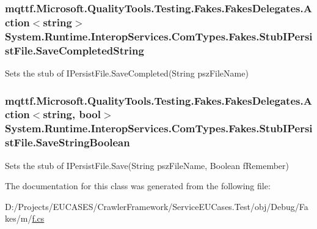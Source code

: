 \hypertarget{class_system_1_1_runtime_1_1_interop_services_1_1_com_types_1_1_fakes_1_1_stub_i_persist_file_a9d11ee894596d550a571c7072408d6ea}{
\subsubsection[{Save\-Completed\-String}]{\setlength{\rightskip}{0pt plus 5cm}mqttf.\-Microsoft.\-Quality\-Tools.\-Testing.\-Fakes.\-Fakes\-Delegates.\-Action$<$string$>$ System.\-Runtime.\-Interop\-Services.\-Com\-Types.\-Fakes.\-Stub\-I\-Persist\-File.\-Save\-Completed\-String}}\label{class_system_1_1_runtime_1_1_interop_services_1_1_com_types_1_1_fakes_1_1_stub_i_persist_file_a9d11ee894596d550a571c7072408d6ea}


Sets the stub of I\-Persist\-File.\-Save\-Completed(\-String psz\-File\-Name)

\hypertarget{class_system_1_1_runtime_1_1_interop_services_1_1_com_types_1_1_fakes_1_1_stub_i_persist_file_adef390bbd75f06dfb1676b0103c910ff}{
\subsubsection[{Save\-String\-Boolean}]{\setlength{\rightskip}{0pt plus 5cm}mqttf.\-Microsoft.\-Quality\-Tools.\-Testing.\-Fakes.\-Fakes\-Delegates.\-Action$<$string, bool$>$ System.\-Runtime.\-Interop\-Services.\-Com\-Types.\-Fakes.\-Stub\-I\-Persist\-File.\-Save\-String\-Boolean}}\label{class_system_1_1_runtime_1_1_interop_services_1_1_com_types_1_1_fakes_1_1_stub_i_persist_file_adef390bbd75f06dfb1676b0103c910ff}


Sets the stub of I\-Persist\-File.\-Save(\-String psz\-File\-Name, Boolean f\-Remember)



The documentation for this class was generated from the following file\-:\begin{DoxyCompactItemize}
\item 
D\-:/\-Projects/\-E\-U\-C\-A\-S\-E\-S/\-Crawler\-Framework/\-Service\-E\-U\-Cases.\-Test/obj/\-Debug/\-Fakes/m/\hyperlink{m_2f_8cs}{f.\-cs}\end{DoxyCompactItemize}
